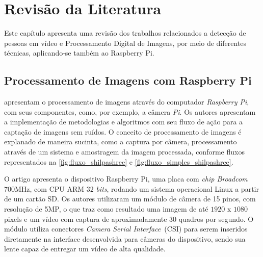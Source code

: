 \documentclass[12pt,oneside,a4paper,chapter=TITLE,section=TITLE,sumario=tradicional]{abntex2}
\begin{document}
\begin{figure}[htb]
\end{figure}

\chapter{Revisão da Literatura}
\label{cap:revisao-literatura}

Este capítulo apresenta uma revisão dos trabalhos relacionados a detecção de pessoas em vídeo e Processamento Digital de Imagens, por meio de diferentes técnicas, aplicando-se também ao Raspberry Pi.

\section{Processamento de Imagens com Raspberry Pi}

 apresentam o processamento de imagens através do computador \textit{Raspberry Pi}, com seus componentes, como, por exemplo, a câmera \textit{Pi}. Os autores apresentam a implementação de metodologias e algoritmos com seu fluxo de ação para a captação de imagens sem ruídos. O conceito de processamento de imagens é explanado de maneira sucinta, como a captura por câmera, processamento através de um sistema e amostragem da imagem processada, conforme fluxos representados na \autoref{fig:fluxo_shilpashree} e \autoref{fig:fluxo_simples_shilpashree}.

\begin{figure}[htb]
\end{figure}

\begin{figure}[htb]
\end{figure}

O artigo apresenta o dispositivo Raspberry Pi, uma placa com \textit{chip Broadcom} 700MHz, com CPU ARM 32 \textit{bits}, rodando um sistema operacional Linux a partir de um cartão SD. Os autores utilizaram um módulo de câmera de 15 pinos, com resolução de 5MP, o que traz como resultado uma imagem de até $1920$ x $1080$ pixels e um vídeo com captura de aproximadamente 30 quadros por segundo. O módulo utiliza conectores \textit{Camera Serial Interface}~(CSI) para serem inseridos diretamente na interface desenvolvida para câmeras do dispositivo, sendo sua lente capaz de entregar um vídeo de alta qualidade.
\end{document}
